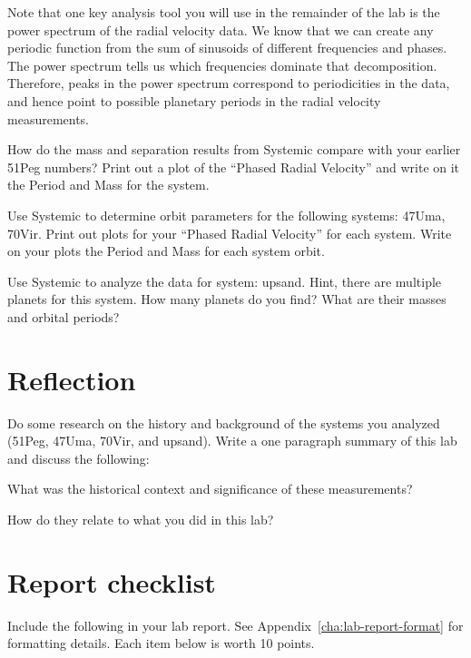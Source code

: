 Note that one key analysis tool you will use in the remainder of the lab is the power spectrum of the radial velocity data. We know that we can create any periodic function from the sum of sinusoids of different frequencies and phases. The power spectrum tells us which frequencies dominate that decomposition. Therefore, peaks in the power spectrum correspond to periodicities in the data, and hence point to possible planetary periods in the radial velocity measurements.

\begin{steps}
	\item How do the mass and separation results from Systemic compare with your earlier 51Peg numbers? Print out a plot of the ``Phased Radial Velocity'' and write on it the Period and Mass for the system.
	
	\item Use Systemic to determine orbit parameters for the following systems: 47Uma, 70Vir. Print out plots for your ``Phased Radial Velocity'' for each system. Write on your plots the Period and Mass for each system orbit.
	
	\item Use Systemic to analyze the data for system: upsand. Hint, there are multiple planets for this system. How many planets do you find? What are their masses and orbital periods?
	
\end{steps}

\section{Reflection}

Do some research on the history and background of the systems you analyzed (51Peg, 47Uma, 70Vir, and upsand). Write a one paragraph summary of this lab and discuss the following:

\begin{steps}
	\item What was the historical context and significance of these measurements?
	
	\item How do they relate to what you did in this lab?
\end{steps}

\section{Report checklist}

Include the following in your lab report. See Appendix~\ref{cha:lab-report-format} for formatting details. Each item below is worth 10 points.

